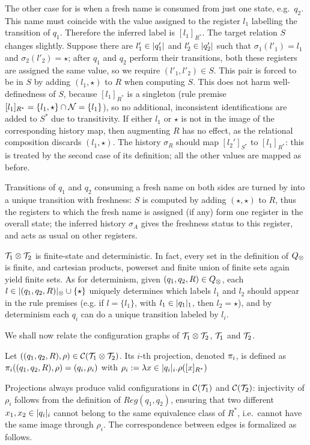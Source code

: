 The other case for \regrule{} is when a fresh name is consumed from just one state, e.g.\ $q_2$.
This name must coincide with the value assigned to the register $l_1$ labelling the transition of $q_1$. Therefore the inferred label is $[l_1]_{R^*}$. The target relation $S$ changes slightly. Suppose there are $l'_1 \in |q'_1|$ and $l'_2\in |q'_2|$ such that $\sigma_1(l'_1) = l_1$ and $\sigma_2(l'_2) = \star$; after $q_1$ and $q_2$ perform their transitions, both these registers are assigned the same value, so we require $(l'_1,l'_2) \in S$. This pair is forced to be in $S$ by adding $(l_1,\star)$ to $R$ when computing $S$. This does not harm well-definedness of $S$, because $[l_1]_{R^*}$ is a singleton (rule premise $[l_1]_{R^*} = \{l_1,\star\} \cap 	\mathcal{N} = \{l_1\}$), so no additional, inconsistent identifications are added to $S^*$ due to transitivity. If either $l_1$ or $\star$ is not in the image of the corresponding history map, then augmenting $R$ has no effect, as the relational composition discards $(l_1,\star)$. The history $\sigma_R$ should map $[l_2']_{S^*}$ to $[l_1]_{R^*}$: this is treated by the second case of its definition; all the other values are mapped as before.

Transitions of $q_1$ and $q_2$ consuming a fresh name on both sides are turned by \allrule{} into a unique transition with freshness: $S$ is computed by adding $(\star,\star)$ to $R$, thus the registers to which the fresh name is assigned (if any) form one register in the overall state; the inferred history $\sigma_A$ gives the freshness status to this register, and acts as usual on other registers.

\begin{remark}
\label{rem:syncp-fin-det}
$\mathcal{T}_1 \otimes \mathcal{T}_2$ is finite-state and deterministic. In fact, every set in the definition of $Q_{\otimes}$ is finite, and cartesian products, powerset and finite union of finite sets again yield finite sets. As for determinism, given $(q_1,q_2,R) \in Q_{\otimes}$, each $l \in |(q_1,q_2,R)|_{\otimes} \cup \{\star\}$ uniquely determines which labels $l_1$ and $l_2$ should appear in the rule premises (e.g. if $l = \{l_1\}$, with $l_1 \in |q_1|_1$, then $l_2 = \star$), and by determinism each $q_i$ can do a unique transition labeled by $l_i$.
\end{remark}
%
We shall now relate the configuration graphs of $\mathcal{T}_1 \otimes \mathcal{T}_2$, $\mathcal{T}_1$ and $\mathcal{T}_2$.
%
\begin{definition}
Let $((q_1,q_2,R),\rho) \in \mathcal{C}(\mathcal{T}_1 \otimes \mathcal{T}_2)$. Its $i$-th projection, denoted $\pi_i$, is defined as
$\pi_i((q_1,q_2,R),\rho) = (q_i,\rho_i)$ with $\rho_i := \lambda x \in |q_i|_i.\rho([x]_{R^*})$
\end{definition}
%
Projections always produce valid configurations in $\mathcal{C}(\mathcal{T}_1)$ and $\mathcal{C}(\mathcal{T}_2)$: injectivity of $\rho_i$ follows from the definition of $Reg(q_1,q_2)$, ensuring that two different $x_1,x_2 \in |q_i|_i$ cannot belong to the same equivalence class of $R^*$, i.e.\ cannot have the same image through $\rho_i$. The correspondence between edges is formalized as follows.

